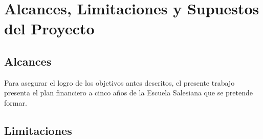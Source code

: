 \section{Alcances, Limitaciones y Supuestos del Proyecto}

\subsection{Alcances}
\label{sub:intro:Alcances}



Para asegurar el logro de los objetivos antes descritos, el presente trabajo presenta el plan financiero a cinco años de la Escuela Salesiana que se pretende formar.

\subsection{Limitaciones}
\label{sub:intro:Limitaciones}








